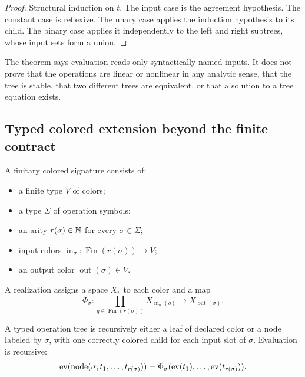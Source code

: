 \begin{proof}
Structural induction on $t$.  The input case is the agreement hypothesis.
The constant case is reflexive. The unary case applies the induction
hypothesis to its child. The binary case applies it independently to the
left and right subtrees, whose input sets form a union.
\end{proof}

\begin{boundary}
The theorem says evaluation reads only syntactically named inputs.  It does
not prove that the operations are linear or nonlinear in any analytic sense,
that the tree is stable, that two different trees are equivalent, or that a
solution to a tree equation exists.
\end{boundary}

\subsection{Typed colored extension beyond the finite contract}

\begin{definition}
\label{def:signature}
A finitary colored signature consists of:
\begin{itemize}
\item a finite type $V$ of colors;
\item a type $\Sigma$ of operation symbols;
\item an arity $r(\sigma)\in\mathbb N$ for every $\sigma\in\Sigma$;
\item input colors
$\operatorname{in}_\sigma:\operatorname{Fin}(r(\sigma))\to V$;
\item an output color $\operatorname{out}(\sigma)\in V$.
\end{itemize}
A realization assigns a space $X_v$ to each color and a map
\[
\Phi_\sigma:
\prod_{q\in\operatorname{Fin}(r(\sigma))}X_{\operatorname{in}_\sigma(q)}
\longrightarrow X_{\operatorname{out}(\sigma)}.
\]
\end{definition}

\begin{definition}
\label{def:operation-tree}
A typed operation tree is recursively either a leaf of declared color or a
node labeled by $\sigma$, with one correctly colored child for each input
slot of $\sigma$.  Evaluation is recursive:
\[
\operatorname{ev}(\operatorname{node}(\sigma;t_1,\ldots,t_{r(\sigma)}))
=
\Phi_\sigma(\operatorname{ev}(t_1),\ldots,\operatorname{ev}(t_{r(\sigma)})).
\]
\end{definition}

